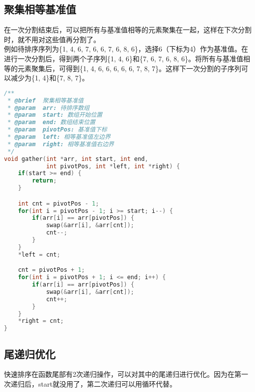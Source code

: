 \vspace{0.5cm}

\subsection{聚集相等基准值}

在一次分割结束后，可以把所有与基准值相等的元素聚集在一起，这样在下次分割时，就不用对这些值再分割了。\\

例如待排序序列为\{1, 4, 6, 7, 6, 6, 7, 6, 8, 6\}，选择6（下标为4）作为基准值。在进行一次分割后，得到两个子序列\{1, 4, 6\}和\{7, 6, 7, 6, 8, 6\}。将所有与基准值相等的元素聚集后，可得到\{1, 4, 6, 6, 6, 6, 6, 7, 8, 7\}。这样下一次分割的子序列可以减少为\{1, 4\}和\{7, 8, 7\}。\\


\begin{lstlisting}[language=C]
/**
 * @brief  聚集相等基准值
 * @param  arr: 待排序数组
 * @param  start: 数组开始位置
 * @param  end: 数组结束位置
 * @param  pivotPos: 基准值下标
 * @param  left: 相等基准值左边界
 * @param  right: 相等基准值右边界
 */
void gather(int *arr, int start, int end, 
            int pivotPos, int *left, int *right) {
    if(start >= end) {
        return;
    }

    int cnt = pivotPos - 1;
    for(int i = pivotPos - 1; i >= start; i--) {
        if(arr[i] == arr[pivotPos]) {
            swap(&arr[i], &arr[cnt]);
            cnt--;
        }
    }
    *left = cnt;

    cnt = pivotPos + 1;
    for(int i = pivotPos + 1; i <= end; i++) {
        if(arr[i] == arr[pivotPos]) {
            swap(&arr[i], &arr[cnt]);
            cnt++;
        }
    }
    *right = cnt;
}
\end{lstlisting}

\vspace{0.5cm}

\subsection{尾递归优化}

快速排序在函数尾部有2次递归操作，可以对其中的尾递归进行优化。因为在第一次递归后，start就没用了，第二次递归可以用循环代替。\\


